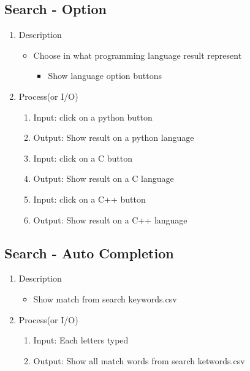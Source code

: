 \documentclass[conference]{IEEEtran}
\begin{document}
\begin{itemize}
\begin{itemize}
\begin{itemize}
\begin{itemize}
\subsection{Search - Option}
\begin{enumerate}
\item Description
\begin{itemize}
  \item Choose in what programming language result represent
  \begin{itemize}
     \item Show language option buttons
  \end{itemize}
\end{itemize}
\item Process(or I/O)
  \begin{enumerate}
    \item Input: click on a python button 
    \item Output: Show result on a python language 
    \item Input: click on a C button 
    \item Output: Show result on a C language 
    \item Input: click on a C++ button 
    \item Output: Show result on a C++ language 
  \end{enumerate}
\end{enumerate}
\textit{}

\subsection{Search - Auto Completion}
\begin{enumerate}
\item Description
\begin{itemize}
  \item Show match from search keywords.csv
\end{itemize}
\item Process(or I/O)
  \begin{enumerate}
     \item Input: Each letters typed
    \item Output: Show all match words from search ketwords.csv
  \end{enumerate}
\end{enumerate}
\textit{}


\end{itemize}
\end{itemize}
\end{itemize}
\end{itemize}
\end{document}
